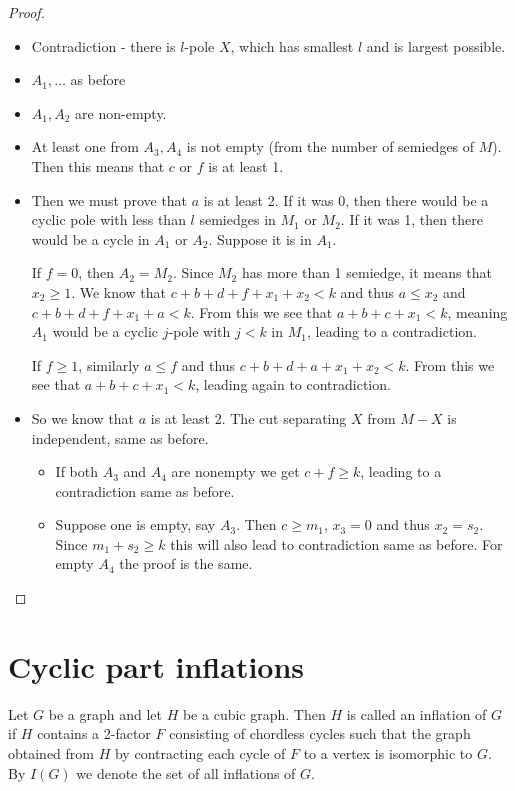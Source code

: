 \documentclass[12pt, twoside]{book}
\begin{document}
\begin{proof}
	\begin{itemize}
		\item Contradiction - there is $l$-pole $X$, which has smallest $l$ and is largest possible.
		\item $A_1,\dots$ as before
		\item $A_1,A_2$ are non-empty.
		\item At least one from $A_3,A_4$ is not empty (from the number of semiedges of $M$). Then this means that $c$ or $f$ is at least 1.
		\item Then we must prove that $a$ is at least 2. If it was 0, then there would be a cyclic pole with less than $l$ semiedges in $M_1$ or $M_2$. If it was 1, then there would be a cycle in $A_1$ or $A_2$. Suppose it is in $A_1$. 
		
		If $f=0$, then $A_2=M_2$. Since $M_2$ has more than 1 semiedge, it means that $x_2\geq 1$. We know that $c+b+d+f+x_1+x_2<k$ and thus $a\leq x_2$ and $c+b+d+f+x_1+a<k$. From this we see that $a+b+c+x_1<k$, meaning $A_1$ would be a cyclic $j$-pole with $j<k$ in $M_1$, leading to a contradiction.
		
		If $f\geq 1$, similarly $a\leq f$ and thus $c+b+d+a+x_1+x_2<k$. From this we see that $a+b+c+x_1<k$, leading again to contradiction.
		\item So we know that $a$ is at least 2. The cut separating $X$ from $M-X$ is independent, same as before.
		\begin{itemize}
			\item If both $A_3$ and $A_4$ are nonempty we get $c+f\geq k$, leading to a contradiction same as before.
			\item Suppose one is empty, say $A_3$. Then $c\geq m_1$, $x_3=0$ and thus $x_2=s_2$. Since $m_1+s_2\geq k$ this will also lead to contradiction same as before. For empty $A_4$ the proof is the same.
		\end{itemize}
	\end{itemize}
\end{proof}

\section{Cyclic part inflations}\label{sec:cyclic-part-inflations}

\begin{definition}
	Let $G$ be a graph and let $H$ be a cubic graph. Then $H$ is called an inflation of $G$ if $H$ contains a 2-factor $F$ consisting of chordless cycles such that the graph obtained from $H$ by contracting each cycle of $F$ to a vertex is isomorphic to $G$. By $I(G)$ we denote the set of all inflations of $G$.
\end{definition}
\end{document}
